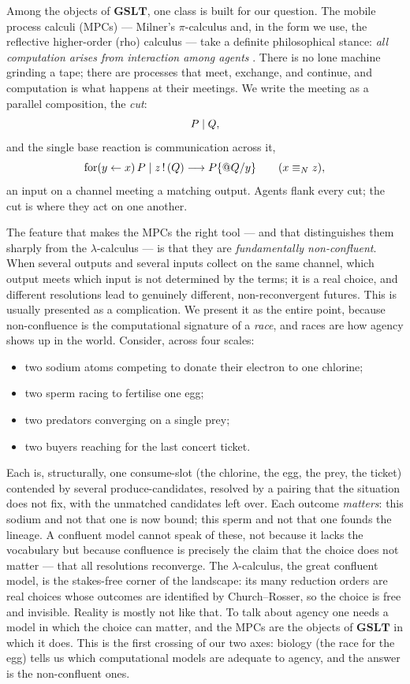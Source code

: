 Among the objects of $\mathbf{GSLT}$, one class is built for our question. The mobile
process calculi (MPCs) --- Milner's $\pi$-calculus and, in the form we use, the
reflective higher-order (rho) calculus \cite{RHO} --- take a definite philosophical
stance: \emph{all computation arises from interaction among agents}
\cite{milnerCC}. There is no lone machine grinding a tape; there are processes that
meet, exchange, and continue, and computation is what happens at their meetings. We
write the meeting as a parallel composition, the \emph{cut}:
\[
P \mid Q,
\]
and the single base reaction is communication across it,
\[
\mathrm{for}(y \leftarrow x)\,P \mid z\,!\,(Q) \longrightarrow P\{@Q/y\} \qquad (x \equiv_N z),
\]
an input on a channel meeting a matching output. Agents flank every cut; the cut is
where they act on one another.

The feature that makes the MPCs the right tool --- and that distinguishes them
sharply from the $\lambda$-calculus --- is that they are \emph{fundamentally
non-confluent}. When several outputs and several inputs collect on the same channel,
which output meets which input is not determined by the terms; it is a real choice,
and different resolutions lead to genuinely different, non-reconvergent futures.
This is usually presented as a complication. We present it as the entire point,
because non-confluence is the computational signature of a \emph{race}, and races
are how agency shows up in the world. Consider, across four scales:

\begin{itemize}[leftmargin=1.4em]
\item two sodium atoms competing to donate their electron to one chlorine;
\item two sperm racing to fertilise one egg;
\item two predators converging on a single prey;
\item two buyers reaching for the last concert ticket.
\end{itemize}

\noindent
Each is, structurally, one consume-slot (the chlorine, the egg, the prey, the
ticket) contended by several produce-candidates, resolved by a pairing that the
situation does not fix, with the unmatched candidates left over. Each outcome
\emph{matters}: this sodium and not that one is now bound; this sperm and not that
one founds the lineage. A confluent model cannot speak of these, not because it
lacks the vocabulary but because confluence is precisely the claim that the choice
does not matter --- that all resolutions reconverge. The $\lambda$-calculus, the
great confluent model, is the stakes-free corner of the landscape: its many
reduction orders are real choices whose outcomes are identified by Church--Rosser,
so the choice is free and invisible. Reality is mostly not like that. To talk about
agency one needs a model in which the choice can matter, and the MPCs are the
objects of $\mathbf{GSLT}$ in which it does. This is the first crossing of our two axes:
biology (the race for the egg) tells us which computational models are adequate to
agency, and the answer is the non-confluent ones.

